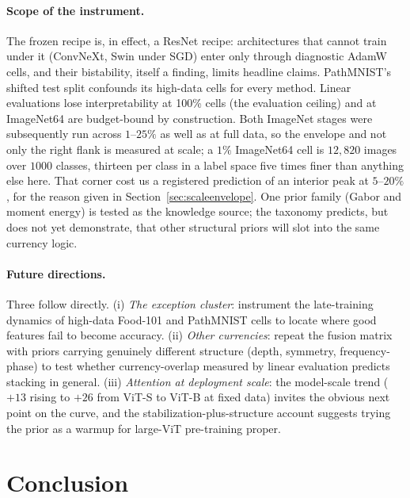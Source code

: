\paragraph{Scope of the instrument.}  The frozen recipe is, in effect, a
ResNet recipe: architectures that cannot train under it (ConvNeXt, Swin
under SGD) enter only through diagnostic AdamW cells, and their
bistability, itself a finding, limits headline claims. PathMNIST's
shifted test split confounds its high-data cells for every method. Linear
evaluations lose interpretability at 100\% cells (the evaluation ceiling)
and at ImageNet64
are budget-bound by construction. Both ImageNet stages were
subsequently run across $1$--$25\%$ as well as at full data, so the envelope
and not only the right flank is measured at scale; a $1\%$ ImageNet64 cell is
$12{,}820$ images over $1000$ classes, thirteen per class in a label space
five times finer than anything else here. That corner cost us a registered
prediction of an interior peak at $5$--$20\%$, for the reason given in
Section~\ref{sec:scaleenvelope}. One prior family (Gabor and moment energy)
is tested as the knowledge source; the taxonomy predicts, but does not
yet demonstrate, that other structural priors will slot into the same
currency logic.

\paragraph{Future directions.} Three follow directly. (i) \emph{The
exception cluster}: instrument the late-training dynamics of high-data
Food-101 and PathMNIST cells to locate where good features fail to become
accuracy. (ii) \emph{Other currencies}: repeat the fusion matrix with
priors carrying genuinely different structure (depth, symmetry,
frequency-phase) to test whether currency-overlap measured by linear evaluation
predicts stacking in general. (iii) \emph{Attention at deployment
scale}: the model-scale trend ($+13$ rising to $+26$ from ViT-S to ViT-B at fixed
data) invites the obvious next point on the curve, and the
stabilization-plus-structure account suggests trying the prior as a
warmup for large-ViT pre-training proper.

\section{Conclusion}\label{sec:conclusion}

